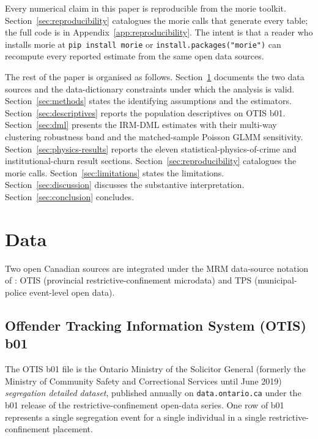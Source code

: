 \documentclass[article,shortnames,nojss]{jss}
\newcommand{\OTIS}{\textsf{OTIS}}
\newcommand{\TPS}{\textsf{TPS}}
\begin{document}
Every numerical claim in this paper is reproducible from the morie
toolkit. Section~\ref{sec:reproducibility} catalogues the morie
calls that generate every table; the full code is in
Appendix~\ref{app:reproducibility}. The intent is that a reader who
installs morie at \texttt{pip install morie} or
\texttt{install.packages("morie")} can recompute every reported
estimate from the same open data sources.

The rest of the paper is organised as follows.
Section~\ref{sec:data} documents the two data sources and the
data-dictionary constraints under which the analysis is valid.
Section~\ref{sec:methods} states the identifying assumptions and the
estimators. Section~\ref{sec:descriptives} reports the population
descriptives on \OTIS{} b01. Section~\ref{sec:dml} presents the IRM-DML
estimates with their multi-way clustering robustness band and the
matched-sample Poisson GLMM sensitivity. Section~\ref{sec:physics-results} reports the eleven
statistical-physics-of-crime and institutional-churn result sections.
Section~\ref{sec:reproducibility} catalogues the morie calls.
Section~\ref{sec:limitations} states the limitations.
Section~\ref{sec:discussion} discusses the substantive interpretation.
Section~\ref{sec:conclusion} concludes.

\section{Data}
\label{sec:data}

Two open Canadian sources are integrated under the MRM data-source
notation of \citet{Ruhela2026MRM}: \OTIS{} (provincial restrictive-confinement
microdata) and \TPS{} (municipal-police event-level open data).

\subsection[Offender Tracking Information System (OTIS) b01]{Offender Tracking Information System (\OTIS{}) b01}
\label{sec:data-otis}

The \OTIS{} b01 file is the Ontario Ministry of the Solicitor General (formerly the
Ministry of Community Safety and Correctional Services until June 2019) \emph{segregation detailed dataset}, published
annually on \texttt{data.ontario.ca} under the b01 release of the
restrictive-confinement open-data series. One row of b01 represents
a single segregation event for a single individual in a single
restrictive-confinement placement.
\end{document}
